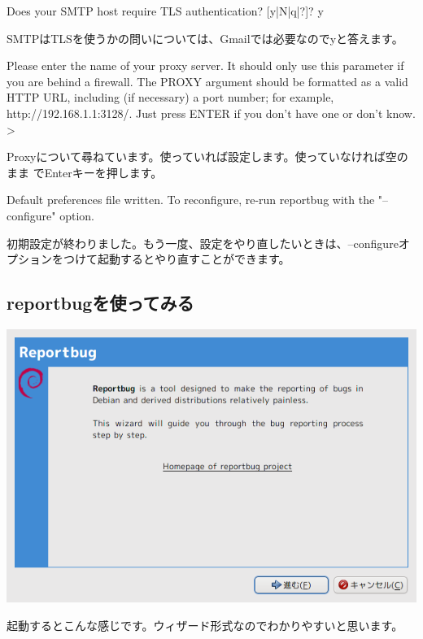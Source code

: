 \documentclass[mingoth,a4paper]{jsarticle}
\begin{document}
\begin{commandline}
Does your SMTP host require TLS authentication? [y|N|q|?]? y
\end{commandline}

SMTPはTLSを使うかの問いについては、Gmailでは必要なのでyと答えます。

\begin{commandline}
Please enter the name of your proxy server. It should only use this parameter if you are behind a firewall. The PROXY
argument should be formatted as a valid HTTP URL, including (if necessary) a port number; for example,
http://192.168.1.1:3128/. Just press ENTER if you don't have one or don't know.
>
\end{commandline}
Proxyについて尋ねています。使っていれば設定します。使っていなければ空のまま
でEnterキーを押します。

\begin{commandline}
Default preferences file written. To reconfigure, re-run reportbug with the "--configure" option.
\end{commandline}
初期設定が終わりました。もう一度、設定をやり直したいときは、--configureオ
プションをつけて起動するとやり直すことができます。

\subsection{reportbugを使ってみる}

 \includegraphics[scale=0.5]{image200909/reportbug-1.png}

起動するとこんな感じです。ウィザード形式なのでわかりやすいと思います。
\end{document}
